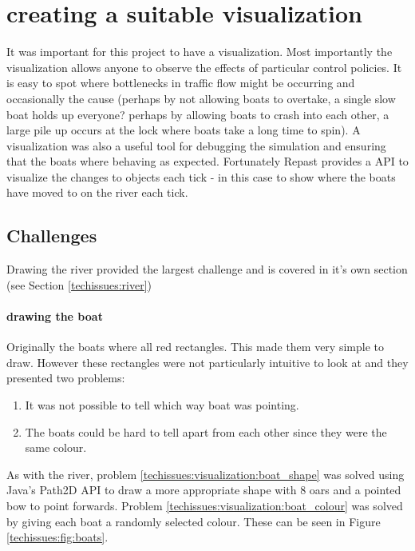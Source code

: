   \section{creating a suitable visualization}
    It was important for this project to have a visualization. Most importantly the visualization allows anyone to observe the effects of particular control policies. It is easy to spot where bottlenecks in traffic flow might be occurring and occasionally the cause (perhaps by not allowing boats to overtake, a single slow boat holds up everyone? perhaps by allowing boats to crash into each other, a large pile up occurs at the lock where boats take a long time to spin). A visualization was also a useful tool for debugging the simulation and ensuring that the boats where behaving as expected. Fortunately Repast provides a API to visualize the changes to objects each tick - in this case to show where the boats have moved to on the river each tick.
    
    \subsection{Challenges}
      Drawing the river provided the largest challenge and is covered in it's own section (see Section \ref{techissues:river})
      
      \paragraph{drawing the boat}
      Originally the boats where all red rectangles. This made them very simple to draw. However these rectangles were not particularly intuitive to look at and they presented two problems:
      \begin{enumerate}
        \item \label{techissues:visualization:boat_shape} It was not possible to tell which way boat was pointing.
        \item \label{techissues:visualization:boat_colour} The boats could be hard to tell apart from each other since they were the same colour. 
      \end{enumerate}
      
      As with the river, problem \ref{techissues:visualization:boat_shape} was solved using Java's Path2D API to draw a more appropriate shape with 8 oars and a pointed bow to point forwards. Problem \ref{techissues:visualization:boat_colour} was solved by giving each boat a randomly selected colour. These can be seen in Figure \ref{techissues:fig:boats}.
      
